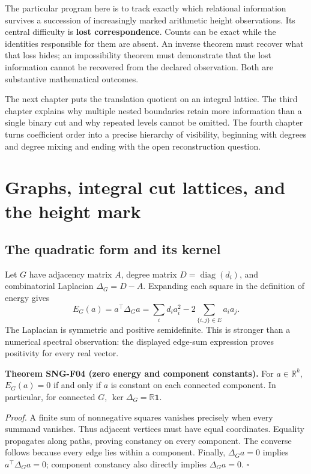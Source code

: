 \documentclass[
  11pt,
  a4paper,
]{report}
\begin{document}
The particular program here is to track exactly which relational
information survives a succession of increasingly marked arithmetic
height observations. Its central difficulty is \textbf{lost
correspondence}. Counts can be exact while the identities responsible
for them are absent. An inverse theorem must recover what that loss
hides; an impossibility theorem must demonstrate that the lost
information cannot be recovered from the declared observation. Both are
substantive mathematical outcomes.

The next chapter puts the translation quotient on an integral lattice.
The third chapter explains why multiple nested boundaries retain more
information than a single binary cut and why repeated levels cannot be
omitted. The fourth chapter turns coefficient order into a precise
hierarchy of visibility, beginning with degrees and degree mixing and
ending with the open reconstruction question.

\hypertarget{graphs-integral-cut-lattices-and-the-height-mark}{%
\chapter{Graphs, integral cut lattices, and the height
mark}\label{graphs-integral-cut-lattices-and-the-height-mark}}

\hypertarget{the-quadratic-form-and-its-kernel}{%
\section{The quadratic form and its
kernel}\label{the-quadratic-form-and-its-kernel}}

Let \(G\) have adjacency matrix \(A\), degree matrix
\(D=\operatorname{diag}(d_i)\), and combinatorial Laplacian
\(\Delta_G=D-A\). Expanding each square in the definition of energy
gives \[
E_G(a)=a^\top\Delta_Ga
=\sum_i d_i a_i^2-2\sum_{\{i,j\}\in E}a_i a_j.
\] The Laplacian is symmetric and positive semidefinite. This is
stronger than a numerical spectral observation: the displayed edge-sum
expression proves positivity for every real vector.

\textbf{Theorem SNG-F04 (zero energy and component constants).} For
\(a\in\mathbb R^k\), \(E_G(a)=0\) if and only if \(a\) is constant on
each connected component. In particular, for connected \(G\),
\(\ker\Delta_G=\mathbb R\mathbf1\).

\emph{Proof.} A finite sum of nonnegative squares vanishes precisely
when every summand vanishes. Thus adjacent vertices must have equal
coordinates. Equality propagates along paths, proving constancy on every
component. The converse follows because every edge lies within a
component. Finally, \(\Delta_Ga=0\) implies \(a^\top\Delta_Ga=0\);
component constancy also directly implies \(\Delta_Ga=0\). \(\square\)
\end{document}
